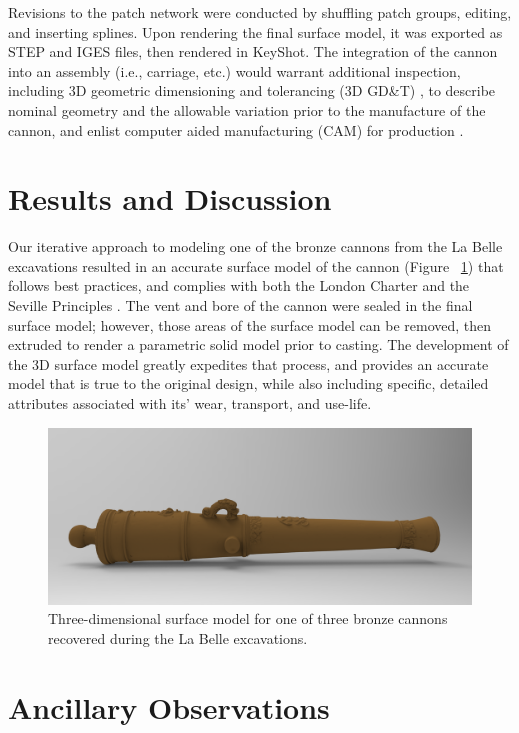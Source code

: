 \documentclass[review]{elsarticle}
\begin{document}
Revisions to the patch network were conducted by shuffling patch groups, editing, and inserting splines. Upon rendering the final surface model, it was exported as STEP and IGES files, then rendered in KeyShot. The integration of the cannon into an assembly (i.e., carriage, etc.) would warrant additional inspection, including 3D geometric dimensioning and tolerancing (3D GD\&T) \citep{RN5875,RN5874,RN5876}, to describe nominal geometry and the allowable variation prior to the manufacture of the cannon, and enlist computer aided manufacturing (CAM) for production \citep{RN5877,RN5878}.

\section*{Results and Discussion}

Our iterative approach to modeling one of the bronze cannons from the La Belle excavations resulted in an accurate surface model of the cannon (Figure ~\ref{fig:Fig5}) that follows best practices, and complies with both the London Charter \citep{RN5872} and the Seville Principles \citep{RN5873}. The vent and bore of the cannon were sealed in the final surface model; however, those areas of the surface model can be removed, then extruded to render a parametric solid model prior to casting. The development of the 3D surface model greatly expedites that process, and provides an accurate model that is true to the original design, while also including specific, detailed attributes associated with its' wear, transport, and use-life.

\begin{figure}[ht]\centering
\includegraphics[width=\linewidth]{FigSurfaceModel}
\caption{Three-dimensional surface model for one of three bronze cannons recovered during the La Belle excavations.}
\label{fig:Fig5}
\end{figure}

\section*{Ancillary Observations}
\end{document}
